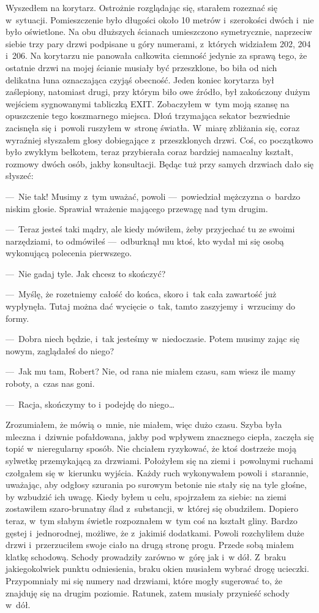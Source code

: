 Wyszedłem na korytarz. Ostrożnie rozglądając się, starałem rozeznać się w~sytuacji. Pomieszczenie było długości około 10 metrów i~szerokości dwóch i~nie było oświetlone. Na obu dłuższych ścianach umieszczono symetrycznie, naprzeciw siebie trzy pary drzwi podpisane u góry numerami, z~których widziałem 202, 204 i~206. Na korytarzu nie panowała całkowita ciemność jedynie za sprawą tego, że ostatnie drzwi na mojej ścianie musiały być przeszklone, bo biła od nich delikatna łuna oznaczająca czyjąś obecność. Jeden koniec korytarza był zaślepiony, natomiast drugi, przy którym biło owe źródło, był zakończony dużym wejściem sygnowanymi tabliczką EXIT. Zobaczyłem w~tym moją szansę na opuszczenie tego koszmarnego miejsca. Dłoń trzymająca sekator bezwiednie zacisnęła się i~powoli ruszyłem w~stronę światła. W~miarę zbliżania się, coraz wyraźniej słyszałem głosy dobiegające z~przeszklonych drzwi. Coś, co początkowo było zwykłym bełkotem, teraz przybierała coraz bardziej namacalny kształt, rozmowy dwóch osób, jakby konsultacji. Będąc tuż przy samych drzwiach dało się słyszeć:

---~Nie tak! Musimy z~tym uważać, powoli ---~powiedział mężczyzna o~bardzo niskim głosie. Sprawiał wrażenie mającego przewagę nad tym drugim.

---~Teraz jesteś taki mądry, ale kiedy mówiłem, żeby przyjechać tu ze swoimi narzędziami, to odmówiłeś ---~odburknął mu ktoś, kto wydał mi się osobą wykonującą polecenia pierwszego.

---~Nie gadaj tyle. Jak chcesz to skończyć?

---~Myślę, że rozetniemy całość do końca, skoro i~tak cała zawartość już wypłynęła. Tutaj można dać wycięcie o~tak, tamto zaszyjemy i~wrzucimy do formy.

---~Dobra niech będzie, i~tak jesteśmy w~niedoczasie. Potem musimy zając się nowym, zaglądałeś do niego?

---~Jak mu tam, Robert? Nie, od rana nie miałem czasu, sam wiesz ile mamy roboty, a~czas nas goni.

---~Racja, skończymy to i~podejdę do niego…

Zrozumiałem, że mówią o~mnie, nie miałem, więc dużo czasu. Szyba była mleczna i~dziwnie pofałdowana, jakby pod wpływem znacznego ciepła, zaczęła się topić w~nieregularny sposób. Nie chciałem ryzykować, że ktoś dostrzeże moją sylwetkę przemykającą za drzwiami. Położyłem się na ziemi i~powolnymi ruchami czołgałem się w~kierunku wyjścia. Każdy ruch wykonywałem powoli i~starannie, uważając, aby odgłosy szurania po surowym betonie nie stały się na tyle głośne, by wzbudzić ich uwagę. Kiedy byłem u celu, spojrzałem za siebie: na ziemi zostawiłem szaro-brunatny ślad z~substancji, w~której się obudziłem. Dopiero teraz, w~tym słabym świetle rozpoznałem w~tym coś na kształt gliny. Bardzo gęstej i~jednorodnej, możliwe, że z~jakimiś dodatkami. Powoli rozchyliłem duże drzwi i~przerzuciłem swoje ciało na drugą stronę progu. Przede sobą miałem klatkę schodową. Schody prowadziły zarówno w~górę jak i~w dół. Z~braku jakiegokolwiek punktu odniesienia, braku okien musiałem wybrać drogę ucieczki. Przypomniały mi się numery nad drzwiami, które mogły sugerować to, że znajduję się na drugim poziomie. Ratunek, zatem musiały przynieść schody w~dół.

